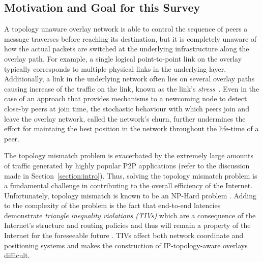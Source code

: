 \subsection{Motivation and Goal for this Survey}
A topology unaware overlay network is able to control the sequence of peers a
message traverses before reaching its destination, but it is completely unaware
of how the actual packets are switched at the underlying infrastructure along
the overlay path. For example, a single logical point-to-point link on the
overlay typically corresponds to multiple physical links in the
underlying layer. Additionally, a link in the underlying network often lies
on several overlay paths causing increase of the traffic on the
link, known as the link's \emph{stress}~\cite{CRSZ2002}. Even in the case
of an approach that provides mechanisms to a newcoming node to detect close-by
peers at join time, the stochastic behaviour with which peers join and leave
the overlay network, called the network's churn, further undermines the effort
for maintaing the best position in the network throughout the life-time of a
peer.

The topology mismatch problem is exacerbated by the extremely large amounts of
traffic generated by highly popular P2P applications (refer to the discussion
made in Section~\ref{section:intro}). Thus, solving the topology mismatch
problem is a fundamental challenge in contributing to the overall efficiency of
the Internet. Unfortunately, topology mismatch is known to be an NP-Hard problem
\cite{NPBOOK,chawathe_scattercast_2000}. Adding to the complexity of the problem
is the fact that end-to-end latencies demonstrate \emph{triangle inequality
violations (TIVs)} which are a consequence of the Internet's structure and
routing policies and thus will remain a property of the Internet for the
foreseeable future \cite{zheng_irprtt_2005}. TIVs affect both network coordinate
\cite{cox_vivaldi_2004,wong_meridian_2005} and positioning \cite{ng_gnp_2001}
systems and makes the construction of IP-topology-aware overlays difficult.

